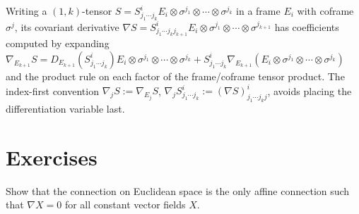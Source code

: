\begin{definition}
  \label{def:pet-ch2-covariant-derivative-index-notation}
  \leanok
  Writing a $(1,k)$-tensor $S=S^i_{j_1\cdots j_k}E_i\otimes\sigma^{j_1}\otimes\cdots\otimes\sigma^{j_k}$
  in a frame $E_i$ with coframe $\sigma^j$, its covariant derivative
  $\nabla S=S^i_{j_1\cdots j_kj_{k+1}}E_i\otimes\sigma^{j_1}\otimes\cdots\otimes\sigma^{j_{k+1}}$
  has coefficients computed by expanding
  $\nabla_{E_{k+1}}S=D_{E_{k+1}}(S^i_{j_1\cdots j_k})E_i\otimes\sigma^{j_1}\otimes\cdots\otimes\sigma^{j_k}
  +S^i_{j_1\cdots j_k}\nabla_{E_{k+1}}(E_i\otimes\sigma^{j_1}\otimes\cdots\otimes\sigma^{j_k})$
  and the product rule on each factor of the frame/coframe tensor product. The
  index-first convention $\nabla_jS:=\nabla_{E_j}S$,
  $\nabla_jS^i_{j_1\cdots j_k}:=(\nabla S)^i_{j_1\cdots j_kj}$, avoids placing
  the differentiation variable last.
\end{definition}

\section{Exercises}

\begin{remark}
  \label{rem:pet-ch2-ex-1}
  \leanok
  Show that the connection on Euclidean space is the only affine connection
  such that $\nabla X=0$ for all constant vector fields $X$.
\end{remark}

